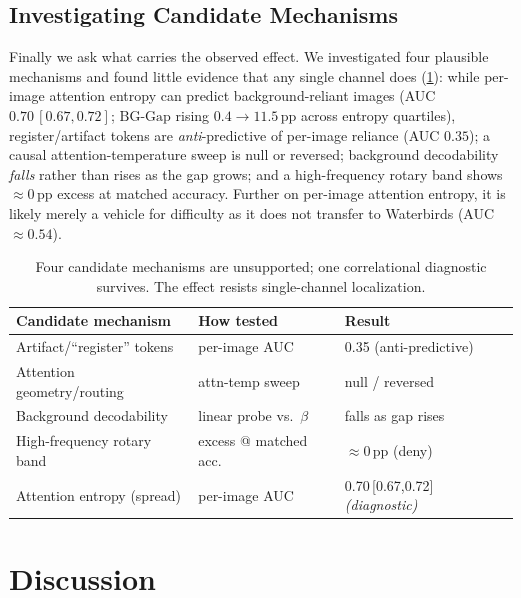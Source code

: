 \documentclass[10pt,twocolumn,letterpaper]{article}
\begin{document}
\subsection{Investigating Candidate Mechanisms}
\label{sec:mechanisms}
Finally we ask what carries the observed effect. We investigated four plausible mechanisms and found little evidence that any single channel does (\cref{tab:mech}): while per-image attention entropy can predict background-reliant images (AUC $0.70\,[0.67,0.72]$; $\mathrm{BG\text{-}Gap}$ rising $0.4 \to 11.5$\,pp across entropy quartiles), register/artifact tokens are \emph{anti}-predictive of per-image reliance (AUC $0.35$); a causal attention-temperature sweep is null or reversed; background decodability \emph{falls} rather than rises as the gap grows; and a high-frequency rotary band shows $\approx 0$\,pp excess at matched accuracy. Further on per-image attention entropy, it is likely merely a vehicle for difficulty as it does not transfer to Waterbirds (AUC $\approx 0.54$).

\begin{table}[t]
  \centering\small
  \begin{tabular}{@{}lll@{}}
    \toprule
    Candidate mechanism & How tested & Result \\
    \midrule
    Artifact/``register'' tokens     & per-image AUC          & 0.35 (anti-predictive) \\
    Attention geometry/routing       & attn-temp sweep & null / reversed \\
    Background decodability          & linear probe vs.\ $\beta$ & falls as gap rises \\
    High-frequency rotary band       & excess @ matched acc.  & $\approx 0$\,pp (deny) \\
    \midrule
    Attention entropy (spread)       & per-image AUC          & 0.70\,[0.67,0.72] \emph{(diagnostic)} \\
    \bottomrule
  \end{tabular}
  \caption{Four candidate mechanisms are unsupported; one correlational diagnostic survives. The effect
    resists single-channel localization.}
  \label{tab:mech}
\end{table}

\section{Discussion}
\end{document}
